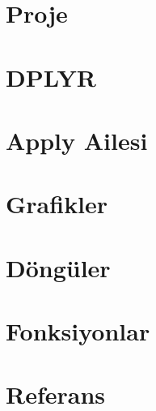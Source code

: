 \documentclass[
]{book}
\begin{document}
\hypertarget{proje}{%
\chapter{Proje}\label{proje}}

\hypertarget{dplyr}{%
\chapter{DPLYR}\label{dplyr}}

\hypertarget{apply-ailesi}{%
\chapter{Apply Ailesi}\label{apply-ailesi}}

\hypertarget{grafikler}{%
\chapter{Grafikler}\label{grafikler}}

\hypertarget{duxf6nguxfcler}{%
\chapter{Döngüler}\label{duxf6nguxfcler}}

\hypertarget{fonksiyonlar}{%
\chapter{Fonksiyonlar}\label{fonksiyonlar}}

\hypertarget{referans}{%
\chapter{Referans}\label{referans}}

  
\end{document}
